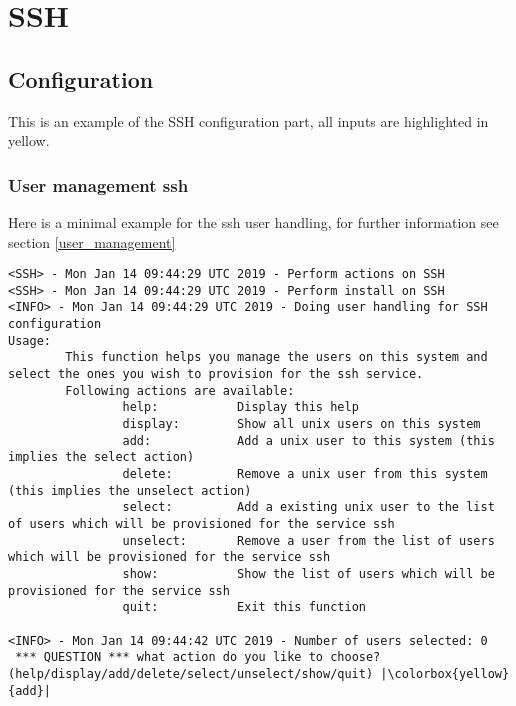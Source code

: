 \section{SSH}
 \subsection{Configuration}
 This is an example of the \gls{SSH} configuration part, all inputs are highlighted in yellow.
 \subsubsection{User management ssh}
 Here is a minimal example for the ssh user handling, for further information see section \ref{user_management} 
 \begin{lstlisting}[escapeinside=||]
<SSH> - Mon Jan 14 09:44:29 UTC 2019 - Perform actions on SSH
<SSH> - Mon Jan 14 09:44:29 UTC 2019 - Perform install on SSH
<INFO> - Mon Jan 14 09:44:29 UTC 2019 - Doing user handling for SSH configuration
Usage:
        This function helps you manage the users on this system and select the ones you wish to provision for the ssh service.
        Following actions are available:
                help:           Display this help
                display:        Show all unix users on this system
                add:            Add a unix user to this system (this implies the select action)
                delete:         Remove a unix user from this system (this implies the unselect action)
                select:         Add a existing unix user to the list of users which will be provisioned for the service ssh
                unselect:       Remove a user from the list of users which will be provisioned for the service ssh
                show:           Show the list of users which will be provisioned for the service ssh
                quit:           Exit this function
                                                                                                                                                                                                                                                                                                                                              
<INFO> - Mon Jan 14 09:44:42 UTC 2019 - Number of users selected: 0
 *** QUESTION *** what action do you like to choose? (help/display/add/delete/select/unselect/show/quit) |\colorbox{yellow}{add}|
                                                                                                                                                                                                                                                                                                                                              

\end{lstlisting}
